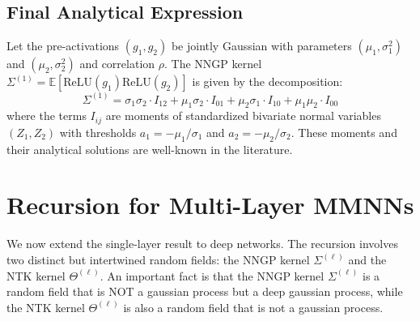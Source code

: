 \documentclass[12pt]{article}
\begin{document}
\subsection{Final Analytical Expression}
\begin{theorem}
Let the pre-activations $(g_1, g_2)$ be jointly Gaussian with parameters $(\mu_1, \sigma_1^2)$ and $(\mu_2, \sigma_2^2)$ and correlation $\rho$. The NNGP kernel $\Sigma^{(1)} = \mathbb{E}[\text{ReLU}(g_1)\text{ReLU}(g_2)]$ is given by the decomposition:
\begin{equation}
\label{eq:final_ntk_decomp}
\boxed{
\Sigma^{(1)} = \sigma_1\sigma_2 \cdot I_{12} + \mu_1\sigma_2 \cdot I_{01} + \mu_2\sigma_1 \cdot I_{10} + \mu_1\mu_2 \cdot I_{00}
}
\end{equation}
where the terms $I_{ij}$ are moments of standardized bivariate normal variables $(Z_1, Z_2)$ with thresholds $a_1 = -\mu_1/\sigma_1$ and $a_2 = -\mu_2/\sigma_2$. These moments and their analytical solutions are well-known in the literature.
\end{theorem}







\section{Recursion for Multi-Layer MMNNs}
We now extend the single-layer result to deep networks. The recursion involves two distinct but intertwined random fields: the NNGP kernel $\Sigma^{(\ell)}$ and the NTK kernel $\Theta^{(\ell)}$.
An important fact is that the NNGP kernel $\Sigma^{(\ell)}$ is a random field that is NOT a gaussian process but a deep gaussian process, while the NTK kernel $\Theta^{(\ell)}$ is also a random field that is not a gaussian process.
\end{document}
